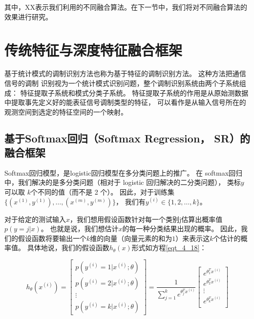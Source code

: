 其中，XX表示我们利用的不同融合算法。在下一节中，我们将对不同融合算法的效果进行研究。


\section{传统特征与深度特征融合框架}

基于统计模式的调制识别方法也称为基于特征的调制识别方法。
这种方法把通信信号的调制
识别视为一个统计模式识别问题，整个调制识别系统由两个子系统组成：
特征提取子系统和模式分类子系统。
特征提取子系统的作用是从原始测数据中提取事先定义好的能表征信号调制类型的特征，
可以看作是从输入信号所在的观测空间到选定的特征空间的一个映射。\par

\subsection{基于Softmax回归（Softmax Regression， SR）的融合框架}
Softmax回归模型，是logistic回归模型在多分类问题上的推广。
在 softmax回归中，我们解决的是多分类问题（相对于 logistic 回归解决的二分类问题），
类标$y$ 可以取 $k$个不同的值（而不是 2 个）。
因此，对于训练集 $\{ (x^{(1)}, y^{(1)}), \dots, (x^{(m)}, y^{(m)}) \}$，
我们有$y^{(i)} \in \{1, 2, \dots, k\}$。\par

对于给定的测试输入$x$，我们想用假设函数针对每一个类别j估算出概率值$p(y=j | x)$。
也就是说，我们想估计$x$的每一种分类结果出现的概率。
因此，我们的假设函数将要输出一个$k$维的向量（向量元素的和为$1$）来表示这$k$个估计的概率值。
具体地说，我们的假设函数$h_{\theta}(x)$形式如方程\ref{eqt_4_18}：\par

\begin{equation}
\label{eqt_4_18}
		h_\theta(x^{(i)}) =
		\begin{bmatrix}
			p(y^{(i)} = 1 | x^{(i)}; \theta) \\
			p(y^{(i)} = 2 | x^{(i)}; \theta) \\
			\vdots \\
			p(y^{(i)} = k | x^{(i)}; \theta)
		\end{bmatrix}
			=
			\frac{1}{ \sum_{j=1}^{k}{e^{ \theta_j^T x^{(i)} }} }
			\begin{bmatrix}
			e^{ \theta_1^T x^{(i)} } \\
			e^{ \theta_2^T x^{(i)} } \\
			\vdots \\
			e^{ \theta_k^T x^{(i)} } \\
			\end{bmatrix}
\end{equation}

